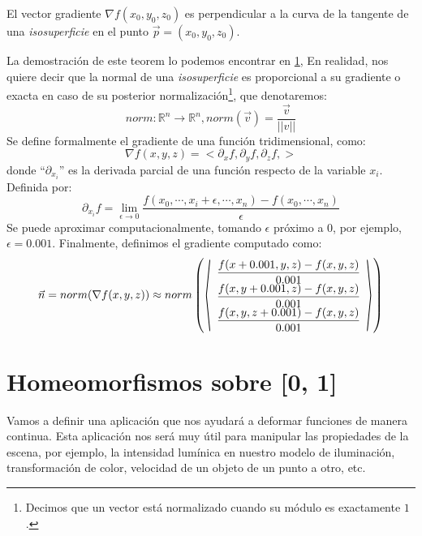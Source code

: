 \begin{theorem}
	El vector gradiente \(\nabla f(x_0, y_0, z_0)\)  es perpendicular a la curva de la tangente de una \textit{isosuperficie} en el punto \(\Vec{p}=(x_0, y_0, z_0)\).
\end{theorem}


La demostración de este teorem lo podemos encontrar en \ref{}, En realidad, nos quiere decir que la normal de una \textit{isosuperficie} es proporcional a su gradiente o exacta en caso de su posterior normalización\footnote{Decimos que un vector está normalizado cuando su módulo es exactamente \(1\) .}, que denotaremos:
\[norm:\mathbb{R}^n\longrightarrow\mathbb{R}^n, norm(\Vec{v})=\dfrac{\Vec{v}}{\vert\vert v \vert\vert}\]
Se define formalmente el gradiente de una función tridimensional, como:
\[ \nabla f(x, y, z)= < \partial_x f, \partial_y f, \partial_z f, > \]
donde \enquote{\(\partial_{x_i}\)} es la derivada parcial de una función respecto de la variable \(x_i\). Definida por: 
\[ \partial_{x_i}f=\lim_{\epsilon\longrightarrow 0}\dfrac{f(x_0,\cdots,x_i+\epsilon,\cdots,x_n)-f(x_0, \cdots, x_n)}{\epsilon} \]
Se puede aproximar computacionalmente, tomando \(\epsilon\) próximo a \(0\), por ejemplo, \(\epsilon = 0.001\).
Finalmente, definimos el gradiente computado como:
\[
\Vec{n}=norm(\nabla f(x, y, z))\approx norm\left(
\stretchleftright[1000]{\langle}
{\begin{array}{c}
\dfrac{f(x+0.001,y,z)-f(x,y,z)}{0.001}\\
\dfrac{f(x,y+0.001,z)-f(x,y,z)}{0.001}\\
\dfrac{f(x,y,z+0.001)-f(x,y,z)}{0.001} \end{array}}
{\rangle}\right)
\]

\section{Homeomorfismos sobre [0, 1]}

Vamos a definir una aplicación que nos ayudará a deformar funciones de manera continua. Esta aplicación nos será muy útil para manipular las propiedades de la escena, por ejemplo, la intensidad lumínica en nuestro modelo de iluminación, transformación de color, velocidad de un objeto de un punto a otro, etc.

